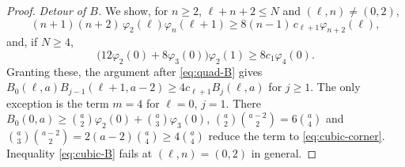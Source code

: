 \begin{proof}
\emph{Detour of $B$.} We show, for $n\geq2$, $\ell+n+2\leq N$ and $(\ell,n)\neq(0,2)$,
\begin{equation}\label{eq:cubic-B}
(n+1)(n+2)\,\varphi_2(\ell)\varphi_n(\ell+1)\geq8(n-1)\,c_{\ell+1}\varphi_{n+2}(\ell),
\end{equation}
and, if $N\geq4$,
\begin{equation}\label{eq:cubic-corner}
\bigl(12\varphi_2(0)+8\varphi_3(0)\bigr)\varphi_2(1)\geq8c_1\varphi_4(0).
\end{equation}
Granting these, the argument after \eqref{eq:quad-B} gives $B_0(\ell,a)B_{j-1}(\ell+1,a-2)\geq4c_{\ell+1}B_j(\ell,a)$ for $j\geq1$. The only exception is the term $m=4$ for $\ell=0$, $j=1$. There $B_0(0,a)\geq\binom a2\varphi_2(0)+\binom a3\varphi_3(0)$, $\binom a2\binom{a-2}2=6\binom a4$ and $\binom a3\binom{a-2}2=2(a-2)\binom a4\geq4\binom a4$ reduce the term to \eqref{eq:cubic-corner}. Inequality \eqref{eq:cubic-B} fails at $(\ell,n)=(0,2)$ in general.


\end{proof}
